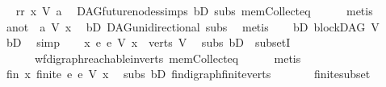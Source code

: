\begin{isabellebody}
\ \isamarkupfalse%
\ rr{\isacharcolon}{\kern0pt}\ {\isachardoublequoteopen}x\ {\isasymrightarrow}\isactrlsup {\isacharplus}{\kern0pt}\isactrlbsub V\isactrlesub \ a{\isachardoublequoteclose}\ \isamarkupfalse%
\ DAG{\isachardot}{\kern0pt}future{\isacharunderscore}{\kern0pt}nodes{\isachardot}{\kern0pt}simps\ bD\ subs\ mem{\isacharunderscore}{\kern0pt}Collect{\isacharunderscore}{\kern0pt}eq\isanewline
\ \ \ \ \isamarkupfalse%
\ metis\isanewline
\ \ \isamarkupfalse%
\ \isamarkupfalse%
\ a{\isacharunderscore}{\kern0pt}not{\isacharcolon}{\kern0pt}\ {\isachardoublequoteopen}{\isasymnot}\ a\ {\isasymrightarrow}\isactrlsup {\isacharasterisk}{\kern0pt}\isactrlbsub V\isactrlesub \ x{\isachardoublequoteclose}\ \isamarkupfalse%
\ bD\ DAG{\isachardot}{\kern0pt}unidirectional\ subs\ \isamarkupfalse%
\ metis\isanewline
\ \ \isamarkupfalse%
\ bD{}{\isacharcolon}{\kern0pt}\ {\isachardoublequoteopen}blockDAG\ V{\isachardoublequoteclose}\ \isamarkupfalse%
\ bD\ \isamarkupfalse%
\ simp\isanewline
\ \ \isamarkupfalse%
\ {\isachardoublequoteopen}{\isasymforall}x{\isachardot}{\kern0pt}\ {\isacharbraceleft}{\kern0pt}e{\isachardot}{\kern0pt}\ e\ {\isasymrightarrow}\isactrlsup {\isacharasterisk}{\kern0pt}\isactrlbsub V\isactrlesub \ x{\isacharbraceright}{\kern0pt}\ {\isasymsubseteq}\ verts\ V{\isachardoublequoteclose}\ \isamarkupfalse%
\ subs\ bD{}\ \ subsetI\isanewline
\ \ \ \ \ \ wf{\isacharunderscore}{\kern0pt}digraph{\isachardot}{\kern0pt}reachable{\isacharunderscore}{\kern0pt}in{\isacharunderscore}{\kern0pt}verts{\isacharparenleft}{\kern0pt}{}{\isacharparenright}{\kern0pt}\ mem{\isacharunderscore}{\kern0pt}Collect{\isacharunderscore}{\kern0pt}eq\isanewline
\ \ \ \ \isamarkupfalse%
\ metis\ \isanewline
\ \ \isamarkupfalse%
\ \isamarkupfalse%
\ fin{\isacharcolon}{\kern0pt}\ {\isachardoublequoteopen}{\isasymforall}x{\isachardot}{\kern0pt}\ finite\ {\isacharbraceleft}{\kern0pt}e{\isachardot}{\kern0pt}\ e\ {\isasymrightarrow}\isactrlsup {\isacharasterisk}{\kern0pt}\isactrlbsub V\isactrlesub \ x{\isacharbraceright}{\kern0pt}{\isachardoublequoteclose}\ \isamarkupfalse%
\ subs\ bD{}\ fin{\isacharunderscore}{\kern0pt}digraph{\isachardot}{\kern0pt}finite{\isacharunderscore}{\kern0pt}verts\ \isanewline
\ \ \ \ \ \ finite{\isacharunderscore}{\kern0pt}subset\isanewline
\ \ \ \ \isamarkupfalse%

\end{isabellebody}
